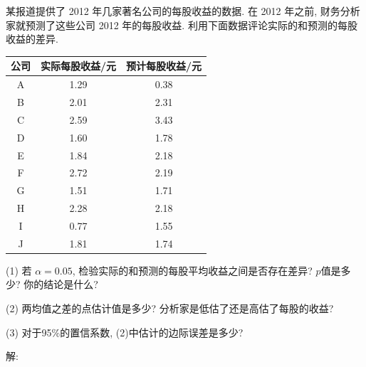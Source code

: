 \documentclass[standard]{ExBook}
\begin{document}
\begin{qitems}
    \begin{bbox}
    \begin{shaded}
        \qitem
某报道提供了 2012 年几家著名公司的每股收益的数据. 在 2012 年之前, 财务分析家就预测了这些公司 2012 年的每股收益. 利用下面数据评论实际的和预测的每股收益的差异.
\begin{center}
\setlength{\tabcolsep}{45pt}
\begin{tabular}{ccc}
\hline
公司 & 实际每股收益/元 & 预计每股收益/元 \\
\hline
A & 1.29 & 0.38 \\
B & 2.01 & 2.31 \\
C & 2.59 & 3.43 \\
D & 1.60 & 1.78 \\
E & 1.84 & 2.18 \\
F & 2.72 & 2.19 \\
G & 1.51 & 1.71 \\
H & 2.28 & 2.18 \\
I & 0.77 & 1.55 \\
J & 1.81 & 1.74 \\
\hline
\end{tabular}
\end{center}
(1) 若 $\alpha=0.05$, 检验实际的和预测的每股平均收益之间是否存在差异? $p$值是多少? 你的结论是什么?

(2) 两均值之差的点估计值是多少? 分析家是低估了还是高估了每股的收益?

(3) 对于95\%的置信系数, (2)中估计的边际误差是多少?
    \end{shaded}
    \end{bbox}

\vspace{-5em}

    \begin{bbox}
解: 
    \end{bbox}

\vspace{-5em}


\end{qitems}
\end{document}
